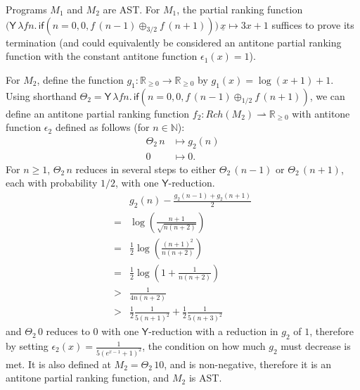 \documentclass{article}
\newcommand{\nnReal}{\mathbb{R}_{{\geq}0}}
\newcommand{\tY}{\mathsf{Y}}
\newcommand{\tif}[3]{\mathsf{if}(#1, #2, #3)} %
\theoremstyle{definition}
\theoremstyle{lemma}
\theoremstyle{remark}
\begin{document}
Programs $M_1$ and $M_2$ are AST. For $M_1$, the partial ranking function $\big(\tY \, \lambda f n . \, \tif{n=0}{0}{f \, (n-1) \oplus_{3/2} f \, (n+1)}\big) \, \underline x \mapsto 3x + 1$ suffices to prove its termination (and could equivalently be considered an antitone partial ranking function with the constant antitone function $\epsilon_1(x) = 1$).

For $M_2$, define the function $g_1 : \nnReal \to \nnReal$ by $g_1(x) = \log(x+1) + 1$.
Using shorthand 
$\Theta_2 = \tY \, \lambda f n . \, 
\tif{n = 0}{0}{f \, (n - 1) \oplus_{1/2} f \, (n + 1)}$, 
we can define an antitone partial ranking function $f_2 : \mathit{Rch}(M_2) \rightharpoonup \nnReal$ with antitone function $\epsilon_2$ defined as follows (for $n \in \mathbb N$):
\begin{align*}
{\Theta_2} \, n 
&\mapsto 
g_2(n)
\\
0 &\mapsto 0.
\end{align*}
For $n \geq 1$, $\Theta_2 \, n$ reduces in several steps to either $\Theta_2 \, (n-1)$ or $\Theta_2 \, (n+1)$, each with probability $1/2$, with one $\tY$-reduction.
\begin{align*}
  & g_2(n) - \frac{g_2(n-1) + g_2(n+1)} 2 \\
  = & \log(\frac{n+1}{\sqrt{n(n+2)}}) \\
  = & \frac 1 2 \log(\frac{(n+1)^2}{n(n+2)}) \\
  = & \frac 1 2 \log(1 + \frac 1 {n(n+2)}) \\
  > & \frac 1 {4n(n+2)} \\
  > & \frac 1 2 \frac 1 {5(n+1)^2} + \frac 1 2 \frac 1 {5(n+3)^2}
\end{align*}
and $\Theta_2 \, 0$ reduces to $0$ with one $\tY$-reduction with a reduction in $g_2$ of $1$, therefore by setting $\epsilon_2(x) = \frac 1 {5(e^{x-1}+1)^2}$, the condition on how much $g_2$ must decrease is met. It is also defined at $M_2 = \Theta_2 \, 10$, and is non-negative, therefore it is an antitone partial ranking function, and $M_2$ is AST.
\end{document}
